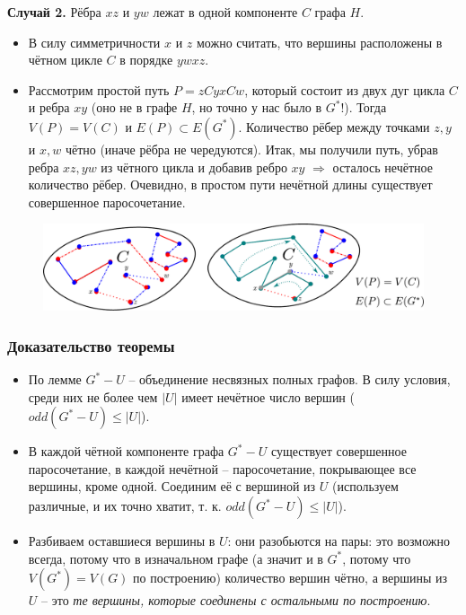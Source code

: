 \begin{frame}[t]
    \small
    \textbf{Случай 2.} Рёбра $xz$ и $yw$ лежат в одной компоненте $C$ графа $H$.

    \begin{itemize}
        \item В силу симметричности $x$ и $z$ можно считать, что
вершины расположены в чётном цикле $C$ в порядке $ywxz$.
        \item Рассмотрим простой путь $P = zCyxCw$, который состоит из двух дуг цикла  $C$ и ребра $xy$ (оно не в графе $H$, но точно у нас было в $G^*$!). Тогда  $V(P) = V(C)$ и  $E(P) \subset E(G^*)$. Количество рёбер между точками $z, y$ и $x, w$ чётно (иначе рёбра не чередуются). Итак, мы получили путь, убрав ребра $xz, yw$ из чётного цикла и добавив ребро $xy$ $ \Rightarrow $ осталось нечётное количество рёбер. Очевидно, в простом пути нечётной длины существует совершенное паросочетание. \hfill \qedsymbol
    \end{itemize}
    \vspace{-5mm}
    \begin{figure}[h]
        \centering
        \includegraphics[width=\textwidth]{images/case2_counterproof}
        \label{fig:case2_counterproof}
    \end{figure}
\end{frame}

\begin{frame}[t]
    \frametitle{Доказательство теоремы}
    \begin{itemize}
        \item По лемме $G^* -U$ -- объединение несвязных полных графов. В силу условия, среди них не более чем  $|U|$ имеет нечётное число вершин ($odd(G^* - U) \leq |U|$).
        \item В каждой чётной компоненте графа $G^* - U$ существует совершенное паросочетание, в каждой нечётной -- паросочетание, покрывающее все вершины, кроме одной. Соединим её с вершиной из $U$ (используем различные, и их точно хватит, т. к. $odd(G^* - U) \leq |U|$).
        \item Разбиваем оставшиеся вершины в $U$: они разобьются на пары: это возможно всегда, потому что в изначальном графе (а значит и в $G^*$, потому что $V(G^*) = V(G)$ по построению) количество вершин чётно, а вершины из $U$ -- это \textit{те вершины, которые соединены с остальными по построению}. \hfill \qedsymbol{}
    \end{itemize}
\end{frame}

